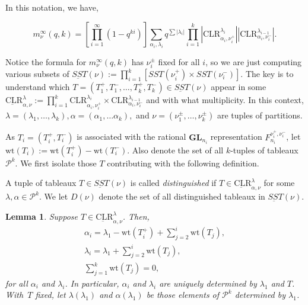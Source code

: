 \documentclass[11pt]{article}
\newtheorem{lemma}[theo]{Lemma}
\theoremstyle{definition}
\numberwithin{equation}{section}
\newcommand{\GL}{\textbf{GL}}
\newcommand{\Par}{\mathcal{P}}
\newcommand{\wt}{\text{wt}}
\newcommand{\CLR}{\text{CLR}}
\begin{document}
In this notation, we have,

$$m_\nu^\infty(q,k) = [\prod_{i=1}^\infty(1-q^{ki})]\sum_{\alpha_i, \lambda_i} q^{\sum |\lambda_i|}\prod_{i=1}^k
    |\CLR^{\lambda_i}_{\alpha_i, \nu_i^+}| |\CLR^{\lambda_{i-1}}_{\alpha_i, \nu_i^-}|.$$

    
Notice the formula for $m_\nu^\infty(q,k)$ has $\nu_i^\pm$ fixed for all $i$, so we are just computing various subsets of $\underbar{SST}(\nu) := \prod_{i=1}^k [SST(\nu_i^+) \times SST(\nu_i^-)]$. The key is to understand which $T = (T_1^+,T_1^-, \dots , T_k^+, T_k^-)\in \underbar{SST}(\nu)$ appear in some $\underbar{\CLR}^\lambda_{\alpha, \nu} := \prod_{i=1}^k \CLR^{\lambda_i}_{\alpha_i, \nu_i^+} \times \CLR^{\lambda_{i-1}}_{\alpha_i, \nu_i^-}$ and with what multiplicity. In this context, $\lambda = (\lambda_1, \dots , \lambda_k), \alpha = (\alpha_1, \dots \alpha_k),$ and $\nu = (\nu_1^\pm, \dots, \nu_k^\pm)$ are tuples of partitions.

As $T_i = (T_i^+, T_i^-)$ is associated with the rational $\GL_{n_i}$ representation $F^{\nu_i^+, \nu_i^-}_{n_i}$, let $\wt(T_i) := \wt(T_i^+) - \wt(T_i^-)$. Also denote the set of all $k$-tuples of tableaux $\Par^k$. We first isolate those $T$ contributing with the following definition.

\begin{defn}
    A tuple of tableaux $T\in \underbar{SST}(\nu)$ is called \emph{distinguished} if $T \in \underbar{\CLR}^\lambda_{\alpha, \nu}$ for some $\lambda, \alpha \in \Par^k$. We let $D(\nu)$ denote the set of all distinguished tableaux in $\underbar{SST}(\nu)$.
\end{defn}

\begin{lemma} \label{lemma-alphalambda}
    Suppose $T\in \underbar{\CLR}^\lambda_{\alpha, \nu}$. Then,
    \begin{gather*}
    \alpha_i = \lambda_1 - \wt(T_i^+) + \sum_{j=2}^i \wt(T_j),\\
    \lambda_i = \lambda_1 + \sum_{j=2}^{i} \wt(T_j),\\
    \sum_{j=1}^k \wt(T_j) = 0,
    \end{gather*}
    for all $\alpha_i$ and $\lambda_i$. In particular, $\alpha_i$ and $\lambda_i$ are uniquely determined by $\lambda_1$ and $T$. With~$T$ fixed, let $\lambda(\lambda_1)$ and $\alpha(\lambda_1)$ be those elements of $\Par^k$ determined by $\lambda_1$.
\end{lemma}
\end{document}
